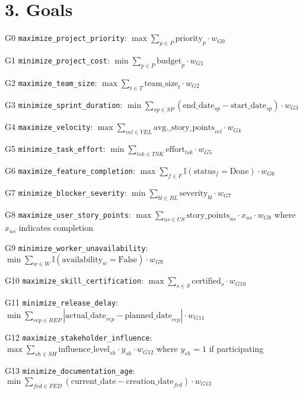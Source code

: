 \documentclass[12pt]{article}
\begin{document}
\section{3. Goals}
\item[G0] \texttt{maximize\_project\_priority}: $\max \sum_{p \in P} \text{priority}_p \cdot w_{G0}$
    \item[G1] \texttt{minimize\_project\_cost}: $\min \sum_{p \in P} \text{budget}_p \cdot w_{G1}$
    \item[G2] \texttt{maximize\_team\_size}: $\max \sum_{t \in T} \text{team\_size}_t \cdot w_{G2}$
    \item[G3] \texttt{minimize\_sprint\_duration}: $\min \sum_{sp \in SP} (\text{end\_date}_{sp} - \text{start\_date}_{sp}) \cdot w_{G3}$
    \item[G4] \texttt{maximize\_velocity}: $\max \sum_{vel \in VEL} \text{avg.\_story\_points}_{vel} \cdot w_{G4}$
    \item[G5] \texttt{minimize\_task\_effort}: $\min \sum_{tsk \in TSK} \text{effort}_{tsk} \cdot w_{G5}$
    \item[G6] \texttt{maximize\_feature\_completion}: $\max \sum_{f \in F} \mathbb{I}(\text{status}_f = \text{Done}) \cdot w_{G6}$
    \item[G7] \texttt{minimize\_blocker\_severity}: $\min \sum_{bl \in BL} \text{severity}_{bl} \cdot w_{G7}$
    \item[G8] \texttt{maximize\_user\_story\_points}: $\max \sum_{us \in US} \text{story\_points}_{us} \cdot x_{us} \cdot w_{G8}$ where $x_{us}$ indicates completion
    \item[G9] \texttt{minimize\_worker\_unavailability}: $\min \sum_{w \in W} \mathbb{I}(\text{availability}_w = \text{False}) \cdot w_{G9}$
    \item[G10] \texttt{maximize\_skill\_certification}: $\max \sum_{s \in S} \text{certified}_s \cdot w_{G10}$
    \item[G11] \texttt{minimize\_release\_delay}: $\min \sum_{rep \in REP} |\text{actual\_date}_{rep} - \text{planned\_date}_{rep}| \cdot w_{G11}$
    \item[G12] \texttt{maximize\_stakeholder\_influence}: $\max \sum_{sh \in SH} \text{influence\_level}_{sh} \cdot y_{sh} \cdot w_{G12}$ where $y_{sh}=1$ if participating
    \item[G13] \texttt{minimize\_documentation\_age}: $\min \sum_{fed \in FED} (\text{current\_date} - \text{creation\_date}_{fed}) \cdot w_{G13}$
\end{document}
